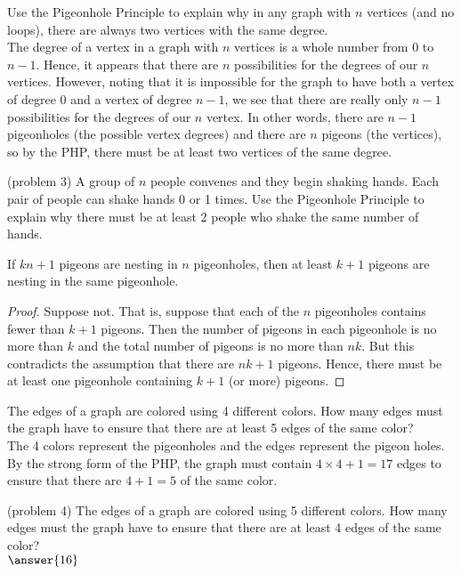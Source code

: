 \documentclass[handout]{ximera}
\begin{document}
\begin{example}[example 3]
Use the Pigeonhole Principle to explain why in any graph with $n$ vertices (and no loops), there are always two vertices with the same degree.\\
The degree of a vertex in a graph with $n$ vertices is a whole number from 0 to $n-1$.  Hence, it appears that there are $n$ possibilities 
for the degrees of our $n$ vertices.  However, noting that it is impossible for the graph to have both a vertex of degree 0 and a vertex of 
degree $n-1$, we see that there are really only $n-1$ possibilities for the degrees of our $n$ vertex. In other words, 
there are $n-1$ pigeonholes (the possible vertex degrees) and there are $n$ pigeons (the vertices), so by the PHP, 
there must be at least two vertices of the same degree.
\end{example}

\begin{problem}(problem 3)
A group of $n$ people convenes and they begin shaking hands. Each pair of people can shake hands 0 or 1 times.
Use the Pigeonhole Principle to explain why there must be at least 2 people who shake the same number of hands.
\end{problem}

\begin{proposition}
If $kn+1$ pigeons are nesting in $n$ pigeonholes, then at least $k+1$ pigeons are nesting in the same pigeonhole.
\end{proposition}

\begin{proof}
Suppose not.  That is, suppose that each of the $n$ pigeonholes contains fewer than $k+1$ pigeons.  Then the number of pigeons in each pigeonhole is no more than $k$
and the total number of pigeons is no more than $nk$.  But this contradicts the assumption that there are $nk+1$ pigeons. Hence, there must be at least one pigeonhole containing 
$k+1$ (or more) pigeons.
\end{proof}

\begin{example}[example 4]
The edges of a graph are colored using 4 different colors.  How many edges must the graph have to ensure that there are at least 5 edges of the same color?\\
The 4 colors represent the pigeonholes and the edges represent the pigeon holes. By the strong form of the PHP, the graph must contain $4\times 4 + 1= 17$ edges to
ensure that there are $4+1=5$ of the same color.
\end{example}

\begin{problem}(problem 4)
The edges of a graph are colored using 5 different colors.  How many edges must the graph have to ensure that there are at least 4 edges of the same color?\\
$\answer{16}$
\end{problem}
\end{document}
